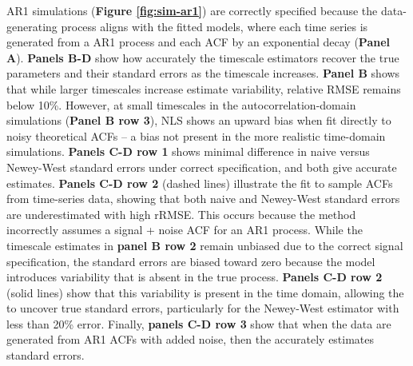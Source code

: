 \documentclass[docs/main.tex]{subfiles}
\begin{document}
AR1 simulations (\textbf{Figure \ref{fig:sim-ar1}}) are correctly specified because the data-generating process aligns with the fitted models, where each time series is generated from a AR1 process and each ACF by an exponential decay (\textbf{Panel A}). \textbf{Panels B-D} show how accurately the timescale estimators recover the true parameters and their standard errors as the timescale increases. \textbf{Panel B} shows that while larger timescales increase estimate variability, relative RMSE remains below 10\%. However, at small timescales in the autocorrelation-domain simulations (\textbf{Panel B row 3}), NLS shows an upward bias when fit directly to noisy theoretical ACFs -- a bias not present in the more realistic time-domain simulations. \textbf{Panels C-D row 1} shows minimal difference in naive versus Newey-West standard errors under correct specification, and both give accurate estimates. \textbf{Panels C-D row 2} (dashed lines) illustrate the  fit to sample ACFs from time-series data, showing that both naive and Newey-West standard errors are underestimated with high rRMSE. This occurs because the method incorrectly assumes a signal + noise ACF for an AR1 process. While the timescale estimates in \textbf{panel B row 2} remain unbiased due to the correct signal specification, the standard errors are biased toward zero because the model introduces variability that is absent in the true process. \textbf{Panels C-D row 2} (solid lines) show that this variability is present in the time domain, allowing the  to uncover true standard errors, particularly for the Newey-West estimator with less than 20\% error. Finally, \textbf{panels C-D row 3} show that when the data are generated from AR1 ACFs with added noise, then the  accurately estimates standard errors.\\
\end{document}
